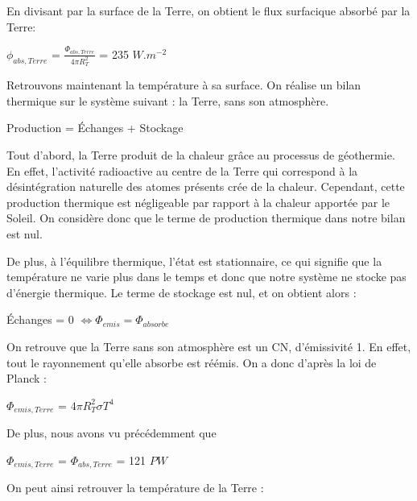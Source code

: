 \documentclass[a4paper, 12pt]{report} %
\begin{document}
    En divisant par la surface de la Terre, 
on obtient le flux surfacique absorbé par la Terre:
\begin{center}
$\phi_{abs,Terre}$ = $\frac {\Phi_{abs,Terre}}{4 \pi R_T^{2}}$
= 235 $W.m^{-2}$
\end{center}

\vspace{\baselineskip}

Retrouvons maintenant la température à sa surface.
On réalise un bilan thermique sur le système suivant : 
la Terre, sans son atmosphère.
\begin{center}
    Production = Échanges + Stockage 
\end{center} \vspace{\baselineskip}

Tout d'abord, la Terre produit de la chaleur grâce au processus de géothermie. En effet, l’activité radioactive au centre de la Terre qui correspond à la désintégration naturelle des atomes présents crée de la chaleur. Cependant, cette production thermique est négligeable par rapport à la chaleur apportée par le Soleil. On considère donc que le terme de production thermique dans notre bilan est nul. \vspace{\baselineskip}

De plus, à l’équilibre thermique, l’état est stationnaire, ce qui signifie que la température ne varie plus dans le temps et donc que notre système ne stocke pas d’énergie thermique. Le terme de stockage est nul, et on obtient alors : 

    \begin{center}
    Échanges = 0 $\Leftrightarrow \Phi_{emis} = \Phi_{absorbe}$
    \end{center}
    \vspace{\baselineskip}

On retrouve que la Terre sans son atmosphère est un CN, d’émissivité 1. En effet, tout le rayonnement qu’elle absorbe est réémis. On a donc d'après la loi de Planck :
\begin{center}
$\Phi_{emis,Terre}$ = $4 \pi R_T^{2} \sigma T^{4}$
\end{center} 

De plus, nous avons vu précédemment que
\begin{center}
$\Phi_{emis,Terre}$ = $\Phi_{abs,Terre}$  = 121 $PW$
\end{center} \vspace{\baselineskip}

On peut ainsi retrouver la température de la Terre : \vspace{\baselineskip}
\begin{center}
\end{center} \vspace{\baselineskip}
\end{document}
